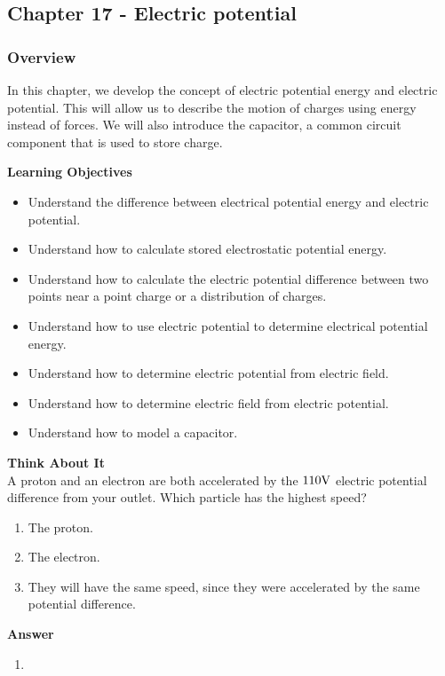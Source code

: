 \subsection{Chapter 17 - Electric potential}

\subsubsection{Overview}\label{chapter:potential}

In this chapter, we develop the concept of electric potential energy and electric potential. This will allow us to describe the motion of charges using energy instead of forces. We will also introduce the capacitor, a common circuit component that is used to store charge.

\begin{framed}
\textbf{Learning Objectives}\\
\begin{itemize}
\item Understand the difference between electrical potential energy and electric potential.
\item Understand how to calculate stored electrostatic potential energy.
\item Understand how to calculate the electric potential difference between two points near a point charge or a distribution of charges.
\item Understand how to use electric potential to determine electrical potential energy.
\item Understand how to determine electric potential from electric field.
\item Understand how to determine electric field from electric potential.
\item Understand how to model a capacitor.
\end{itemize}
\end{framed}

\begin{framed}
\textbf{Think About It}\\
A proton and an electron are both accelerated by the $110 {\rm V}$ electric potential difference from your outlet. Which particle has the highest speed?

\begin{enumerate}
\item The proton.
\item The electron.
\item They will have the same speed, since they were accelerated by the same potential difference.
\end{enumerate}

\begin{framed}
\textbf{Answer}\\
\begin{enumerate}[resume]
\item
\end{enumerate}
\end{framed}
\end{framed}

